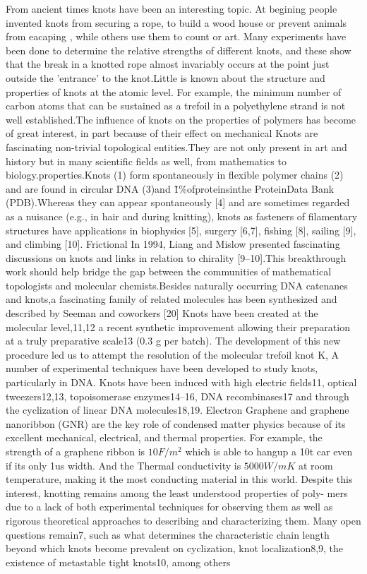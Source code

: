 \documentclass[%
 reprint,
 amsmath,amssymb,
 aps,
prb,
]{revtex4-1}
\begin{document}
From ancient times knots have been an interesting topic. At begining people invented knots from securing a rope, to build a wood house or prevent animals from eacaping , while others use them to count or art\cite{Adams1995}.
\cite{DietrichBuchecker1989}
Many experiments have been done to determine the relative strengths of different knots, and these show that the break in a knotted rope almost invariably occurs at the point just outside the 'entrance' to the knot.Little is known about the structure and properties of
knots at the atomic level. For example, the minimum number of carbon atoms that can be sustained as a trefoil in a polyethylene strand is not well established.The influence of knots on the properties of polymers has become of great interest, in part because of their effect on mechanical Knots are fascinating non-trivial topological entities.They are not only present in art and history but in many scientific fields as well, from mathematics to biology.properties.Knots (1) form spontaneously in flexible  polymer chains (2) and are found in circular DNA (3)and \~1\%ofproteinsinthe ProteinData Bank (PDB).Whereas they can appear spontaneously [4] and are sometimes regarded as a nuisance (e.g., in hair and during knitting), knots as fasteners of filamentary structures have applications in biophysics [5], surgery [6,7], fishing [8], sailing [9], and climbing [10]. Frictional In 1994, Liang and Mislow presented fascinating discussions on knots and links in relation to chirality [9–10].This breakthrough work should help bridge the gap between the communities of mathematical topologists and molecular chemists.Besides naturally occurring DNA catenanes and knots,a fascinating family of
related molecules has been synthesized and described by Seeman and coworkers [20]
Knots have been created at the molecular level,11,12 a recent synthetic improvement allowing their preparation at a truly
preparative scale13 (0.3 g per batch). The development of this new procedure led us to attempt the resolution of the molecular trefoil knot K,
A number of experimental techniques have been developed to study knots, particularly in DNA.
Knots have been induced with high electric fields11, optical tweezers12,13, topoisomerase enzymes14–16, DNA recombinases17 and through the cyclization of linear DNA molecules18,19. Electron
Graphene and graphene nanoribbon (GNR) are the key role of condensed matter physics because of its excellent mechanical, electrical, and thermal properties. For example, the strength of a graphene ribbon is $10F/m^2$ which is able to hangup a 10t car even if its only 1us width. And the Thermal conductivity is $5000W/mK$ at room temperature, making it the most conducting material in this world.
Despite this interest, knotting remains among the least understood properties of poly- mers due to a lack of both experimental techniques for observing them as well as rigorous theoretical approaches to describing and characterizing them. Many open questions remain7, such as what determines the characteristic chain length beyond which knots become prevalent on cyclization, knot localization8,9, the existence of metastable tight knots10, among others
\end{document}
